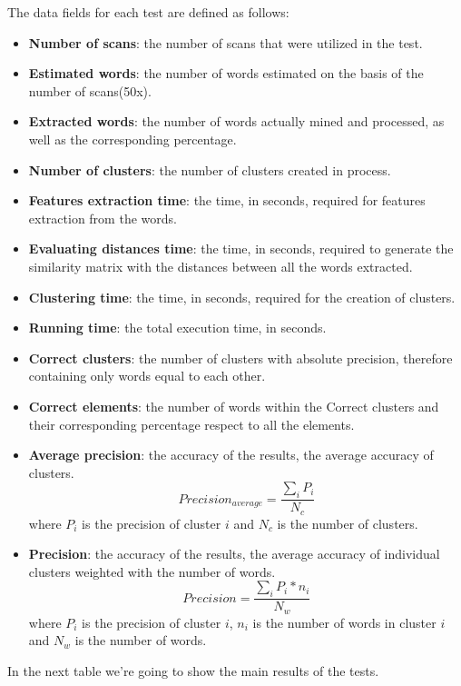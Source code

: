 The data fields for each test are defined as follows:
\begin{itemize}
\item \textbf{Number of scans}: the number of scans that were utilized in the test.
\item \textbf{Estimated words}: the number of words estimated on the basis of the number of scans(50x).
\item\textbf{Extracted words}: the number of words actually mined and processed, as well as the corresponding percentage.
\item \textbf{Number of clusters}: the number of clusters created in process.
\item \textbf{Features extraction time}: the time, in seconds, required for features extraction from the words.
\item \textbf{Evaluating distances time}: the time, in seconds, required to generate the similarity matrix with the distances between all the words extracted.
\item \textbf{Clustering time}: the time, in seconds, required for the creation of clusters.
\item \textbf{Running time}: the total execution time, in seconds.
\item \textbf{Correct clusters}: the number of clusters with absolute precision, therefore containing only words equal to each other.
\item \textbf{Correct elements}: the number of words within the Correct clusters and their corresponding percentage respect to all the elements.
\item \textbf{Average precision}: the accuracy of the results, the average accuracy of clusters.
$$Precision_{average} = \frac{\sum_i P_i}{N_c}$$
where $P_i$ is the precision of cluster $i$ and $N_c$ is the number of clusters. 
\item \textbf{Precision}: the accuracy of the results, the average accuracy of individual clusters weighted with the number of words.
$$Precision = \frac{\sum_i P_i * n_i}{N_w}$$
where $P_i$ is the precision of cluster $i$, $n_i$ is the number of words in cluster $i$ and $N_w$ is the number of words. 
\end{itemize}

In the next table we're going to show the main results of the tests. 

